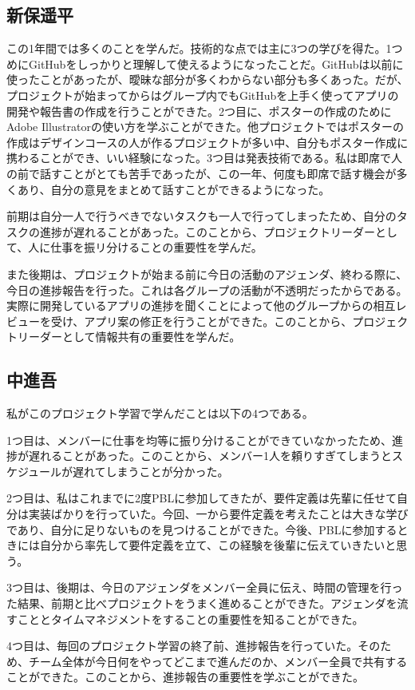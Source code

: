 \documentclass[openany,11pt,papersize]{jsbook}
\begin{document}

\subsection{新保遥平}
\par この1年間では多くのことを学んだ。技術的な点では主に3つの学びを得た。1つめにGitHubをしっかりと理解して使えるようになったことだ。GitHubは以前に使ったことがあったが、曖昧な部分が多くわからない部分も多くあった。だが、プロジェクトが始まってからはグループ内でもGitHubを上手く使ってアプリの開発や報告書の作成を行うことができた。2つ目に、ポスターの作成のためにAdobe Illustratorの使い方を学ぶことができた。他プロジェクトではポスターの作成はデザインコースの人が作るプロジェクトが多い中、自分もポスター作成に携わることができ、いい経験になった。3つ目は発表技術である。私は即席で人の前で話すことがとても苦手であったが、この一年、何度も即席で話す機会が多くあり、自分の意見をまとめて話すことができるようになった。

\par 前期は自分一人で行うべきでないタスクも一人で行ってしまったため、自分のタスクの進捗が遅れることがあった。このことから、プロジェクトリーダーとして、人に仕事を振リ分けることの重要性を学んだ。

\par また後期は、プロジェクトが始まる前に今日の活動のアジェンダ、終わる際に、今日の進捗報告を行った。これは各グループの活動が不透明だったからである。実際に開発しているアプリの進捗を聞くことによって他のグループからの相互レビューを受け、アプリ案の修正を行うことができた。このことから、プロジェクトリーダーとして情報共有の重要性を学んだ。


\subsection{中進吾}
\par 私がこのプロジェクト学習で学んだことは以下の4つである。
\par 1つ目は、メンバーに仕事を均等に振り分けることができていなかったため、進捗が遅れることがあった。このことから、メンバー1人を頼りすぎてしまうとスケジュールが遅れてしまうことが分かった。
\par 2つ目は、私はこれまでに2度PBLに参加してきたが、要件定義は先輩に任せて自分は実装ばかりを行っていた。今回、一から要件定義を考えたことは大きな学びであり、自分に足りないものを見つけることができた。今後、PBLに参加するときには自分から率先して要件定義を立て、この経験を後輩に伝えていきたいと思う。
\par 3つ目は、後期は、今日のアジェンダをメンバー全員に伝え、時間の管理を行った結果、前期と比べプロジェクトをうまく進めることができた。アジェンダを流すこととタイムマネジメントをすることの重要性を知ることができた。
\par 4つ目は、毎回のプロジェクト学習の終了前、進捗報告を行っていた。そのため、チーム全体が今日何をやってどこまで進んだのか、メンバー全員で共有することができた。このことから、進捗報告の重要性を学ぶことができた。
\end{document}
